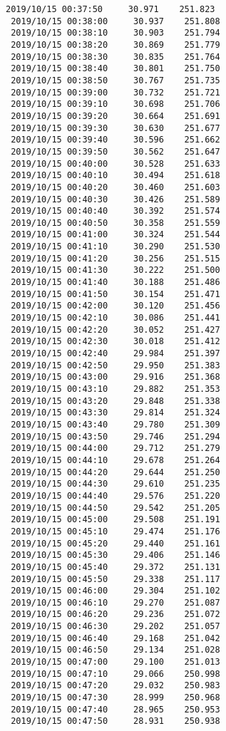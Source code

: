 \documentclass[11pt]{article}
\begin{document}
\begin{Verbatim}[commandchars=\\\{\}]
 2019/10/15 00:37:50     30.971    251.823
 2019/10/15 00:38:00     30.937    251.808
 2019/10/15 00:38:10     30.903    251.794
 2019/10/15 00:38:20     30.869    251.779
 2019/10/15 00:38:30     30.835    251.764
 2019/10/15 00:38:40     30.801    251.750
 2019/10/15 00:38:50     30.767    251.735
 2019/10/15 00:39:00     30.732    251.721
 2019/10/15 00:39:10     30.698    251.706
 2019/10/15 00:39:20     30.664    251.691
 2019/10/15 00:39:30     30.630    251.677
 2019/10/15 00:39:40     30.596    251.662
 2019/10/15 00:39:50     30.562    251.647
 2019/10/15 00:40:00     30.528    251.633
 2019/10/15 00:40:10     30.494    251.618
 2019/10/15 00:40:20     30.460    251.603
 2019/10/15 00:40:30     30.426    251.589
 2019/10/15 00:40:40     30.392    251.574
 2019/10/15 00:40:50     30.358    251.559
 2019/10/15 00:41:00     30.324    251.544
 2019/10/15 00:41:10     30.290    251.530
 2019/10/15 00:41:20     30.256    251.515
 2019/10/15 00:41:30     30.222    251.500
 2019/10/15 00:41:40     30.188    251.486
 2019/10/15 00:41:50     30.154    251.471
 2019/10/15 00:42:00     30.120    251.456
 2019/10/15 00:42:10     30.086    251.441
 2019/10/15 00:42:20     30.052    251.427
 2019/10/15 00:42:30     30.018    251.412
 2019/10/15 00:42:40     29.984    251.397
 2019/10/15 00:42:50     29.950    251.383
 2019/10/15 00:43:00     29.916    251.368
 2019/10/15 00:43:10     29.882    251.353
 2019/10/15 00:43:20     29.848    251.338
 2019/10/15 00:43:30     29.814    251.324
 2019/10/15 00:43:40     29.780    251.309
 2019/10/15 00:43:50     29.746    251.294
 2019/10/15 00:44:00     29.712    251.279
 2019/10/15 00:44:10     29.678    251.264
 2019/10/15 00:44:20     29.644    251.250
 2019/10/15 00:44:30     29.610    251.235
 2019/10/15 00:44:40     29.576    251.220
 2019/10/15 00:44:50     29.542    251.205
 2019/10/15 00:45:00     29.508    251.191
 2019/10/15 00:45:10     29.474    251.176
 2019/10/15 00:45:20     29.440    251.161
 2019/10/15 00:45:30     29.406    251.146
 2019/10/15 00:45:40     29.372    251.131
 2019/10/15 00:45:50     29.338    251.117
 2019/10/15 00:46:00     29.304    251.102
 2019/10/15 00:46:10     29.270    251.087
 2019/10/15 00:46:20     29.236    251.072
 2019/10/15 00:46:30     29.202    251.057
 2019/10/15 00:46:40     29.168    251.042
 2019/10/15 00:46:50     29.134    251.028
 2019/10/15 00:47:00     29.100    251.013
 2019/10/15 00:47:10     29.066    250.998
 2019/10/15 00:47:20     29.032    250.983
 2019/10/15 00:47:30     28.999    250.968
 2019/10/15 00:47:40     28.965    250.953
 2019/10/15 00:47:50     28.931    250.938

\end{Verbatim}
\end{document}
